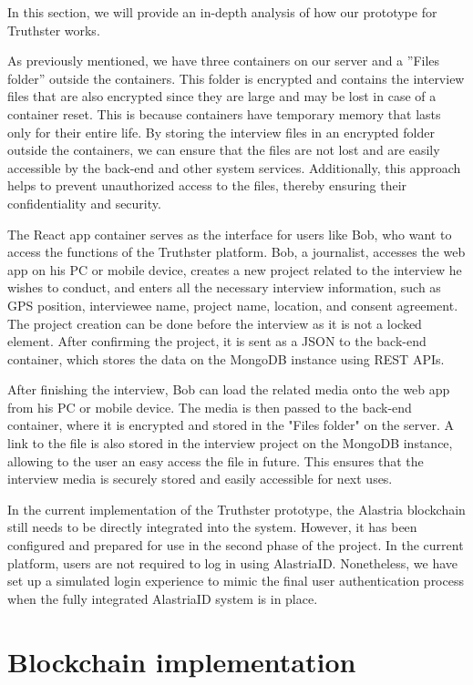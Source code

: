 \documentclass[target=mst,aauheader=]{thud}
\begin{document}
In this section, we will provide an in-depth analysis of how our prototype for Truthster works.\par
As previously mentioned, we have three containers on our server and a ”Files folder” outside the containers. This folder is encrypted and contains the interview files that are also encrypted since they are large and may be lost in case of a container reset. This is because containers have temporary memory that lasts only for their entire life. By storing the interview files in an encrypted folder outside the containers, we can ensure that the files are not lost and are easily accessible by the back-end and other system services. Additionally, this approach helps to prevent unauthorized access to the files, thereby ensuring their confidentiality and security.\par
The React app container serves as the interface for users like Bob, who want to access the functions of the Truthster platform. Bob, a journalist, accesses the web app on his PC or mobile device, creates a new project related to the interview he wishes to conduct, and enters all the necessary interview information, such as GPS position, interviewee name, project name, location, and consent agreement. The project creation can be done before the interview as it is not a locked element. After confirming the project, it is sent as a JSON to the back-end container, which stores the data on the MongoDB instance using REST APIs.\par
After finishing the interview, Bob can load the related media onto the web app from his PC or mobile device. The media is then passed to the back-end container, where it is encrypted and stored in the "Files folder" on the server. A link to the file is also stored in the interview project on the MongoDB instance, allowing to the user an easy access the file in future. This ensures that the interview media is securely stored and easily accessible for next uses.\par
In the current implementation of the Truthster prototype, the Alastria blockchain still needs to be directly integrated into the system. However, it has been configured and prepared for use in the second phase of the project. In the current platform, users are not required to log in using AlastriaID. Nonetheless, we have set up a simulated login experience to mimic the final user authentication process when the fully integrated AlastriaID system is in place.

\section{Blockchain implementation}
\end{document}
